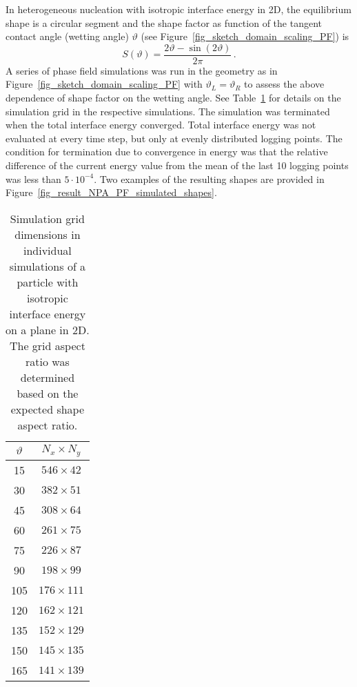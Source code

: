	In heterogeneous nucleation with isotropic interface energy in 2D, the equilibrium shape is a circular segment and the shape factor as function of the tangent contact angle (wetting angle) $\vartheta$ (see Figure~\ref{fig_sketch_domain_scaling_PF}) is
	\begin{equation}
		S(\vartheta) = \frac{2\vartheta - \sin(2\vartheta)}{2\pi} \,.
	\end{equation}
	A series of phase field simulations was run in the geometry as in Figure~\ref{fig_sketch_domain_scaling_PF} with $\vartheta_L=\vartheta_R$ to assess the above dependence of shape factor on the wetting angle. See Table~\ref{tab_PF_NPA_param_particle_onplane} for details on the simulation grid in the respective simulations. The simulation was terminated when the total interface energy converged. Total interface energy was not evaluated at every time step, but only at evenly distributed logging points. The condition for termination due to convergence in energy was that the relative difference of the current energy value from the mean of the last 10 logging points was less than $5\cdot 10^{-4}$. Two examples of the resulting shapes are provided in Figure~\ref{fig_result_NPA_PF_simulated_shapes}.
	\begin{table}
		\centering
		\caption[PF wetting simulation of a particle with isotropic interface energy - simulation grid dimensions]{Simulation grid dimensions in individual simulations of a particle with isotropic interface energy on a plane in 2D. The grid aspect ratio was determined based on the expected shape aspect ratio.}
		\label{tab_PF_NPA_param_particle_onplane}
		\begin{tabular}{c|c}
			$\vartheta$ & $N_x\times N_y$ \\ \hline
			15	&	$546\times 42$	\\
			30	&	$382\times 51$	\\
			45	&	$308\times 64$	\\
			60	&	$261\times 75$	\\
			75	&	$226\times 87$	\\
			90	&	$198\times 99$	\\
			105	&	$176\times 111$	\\
			120	&	$162\times 121$	\\
			135	&	$152\times 129$	\\
			150	&	$145\times 135$	\\
			165	&	$141\times 139$	
		\end{tabular}
	\end{table}
	
